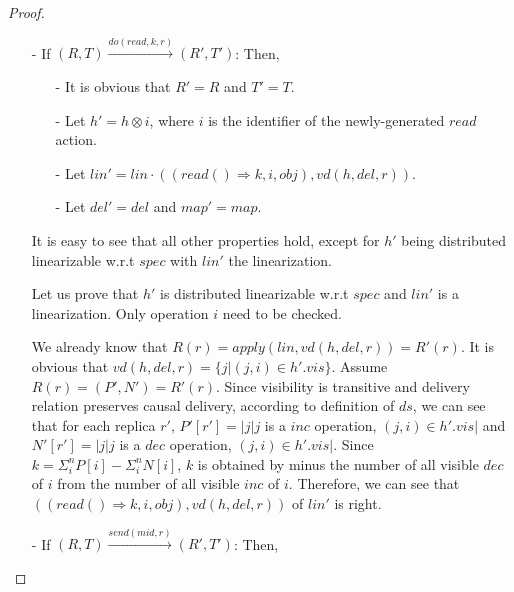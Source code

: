 \begin {proof}
\begin{itemize}
    From the construction of $\mathit{ds}$, it is easy to see that $\mathit{ds}(i) = R(r)[r:R(r)+1]$. Then, it is easy to see that $R'(r) = \mathit{merge}(R(r),\mathit{ds}(i))$.

\item[-] If $(R,T) {\xrightarrow{\mathit{do}(\mathit{read},k,r)}} (R',T')$: Then,

    \begin{itemize}
    \setlength{\itemsep}{0.5pt}
    \item[-] It is obvious that $R' = R$ and $T' = T$.

    \item[-] Let $h' = h \otimes i$, where $i$ is the identifier of the newly-generated $\mathit{read}$ action.

    \item[-] Let $\mathit{lin}' = \mathit{lin} \cdot ((\mathit{read}() \Rightarrow k,i,\mathit{obj}), \mathit{vd}(h,\mathit{del},r) )$.

    \item[-] Let $\mathit{del}' = \mathit{del}$ and $\mathit{map}' = \mathit{map}$.
    \end{itemize}

    It is easy to see that all other properties hold, except for $h'$ being distributed linearizable w.r.t $\mathit{spec}$ with $\mathit{lin}'$ the linearization.

    Let us prove that $h'$ is distributed linearizable w.r.t $\mathit{spec}$ and $\mathit{lin}'$ is a linearization. Only operation $i$ need to be checked. 
    
    We already know that $R(r) = \mathit{apply}(\mathit{lin},\mathit{vd}(h,\mathit{del},r)) = R'(r)$. It is obvious that $\mathit{vd}(h,\mathit{del},r) = \{ j \vert (j,i) \in h'.\mathit{vis} \}$. Assume $R(r)=(P',N') = R'(r)$. Since visibility is transitive and delivery relation preserves causal delivery, according to definition of $\mathit{ds}$, we can see that for each replica $r'$, $P'[r'] = \vert j \vert j$ is a $\mathit{inc}$ operation, $(j,i) \in h'.\mathit{vis} \vert$ and $N'[r'] = \vert j \vert j$ is a $\mathit{dec}$ operation, $(j,i) \in h'.\mathit{vis} \vert$. Since $k = \Sigma_{i}^{n} P[i] - \Sigma_{i}^{n} N[i]$, $k$ is obtained by minus the number of all visible $\mathit{dec}$ of $i$ from the number of all visible $\mathit{inc}$ of $i$. Therefore, we can see that $((\mathit{read}() \Rightarrow k,i,\mathit{obj}), \mathit{vd}(h,\mathit{del},r) )$ of $\mathit{lin}'$ is right. 
\item[-] If $(R,T) {\xrightarrow{\mathit{send}(\mathit{mid},r)}} (R',T')$: Then, 


\end{itemize}
\end{proof}
